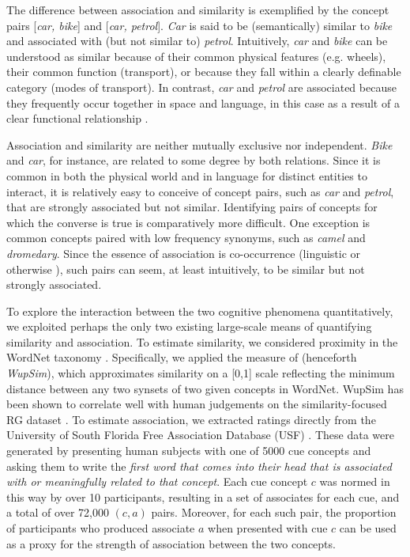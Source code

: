 The difference between association and similarity is exemplified by the concept pairs [\emph{car, bike}] and [\emph{car, petrol}]. \emph{Car} is said to be (semantically) similar to \emph{bike} and associated with (but not similar to) \emph{petrol}. Intuitively, \emph{car} and \emph{bike} can be understood as similar because of their common physical features (e.g. wheels), their common function (transport), or because they fall within a clearly definable category (modes of transport). In contrast, \emph{car} and \emph{petrol} are associated because they frequently occur together in space and language, in this case as a result of a clear functional relationship \cite{plaut1995semantic,mcrae2012semantic}. 

Association and similarity are neither mutually exclusive nor independent. \emph{Bike} and \emph{car}, for instance, are related to some degree by both relations. Since it is common in both the physical world and in language for distinct entities to interact, it is relatively easy to conceive of concept pairs, such as \emph{car} and \emph{petrol}, that are strongly associated but not similar. Identifying pairs of concepts for which the converse is true is comparatively more difficult. One exception is common concepts paired with low frequency synonyms, such as \emph{camel} and \emph{dromedary}. Since the essence of association is co-occurrence (linguistic or otherwise \cite{mcrae2012semantic}), such pairs can seem, at least intuitively, to be similar but not strongly associated.  

To explore the interaction between the two cognitive phenomena quantitatively, we exploited perhaps the only two existing large-scale means of quantifying similarity and association. To estimate similarity, we considered proximity in the WordNet taxonomy \cite{fellbaum1999wordnet}. Specifically, we applied the measure of \cite{wu1994verbs} (henceforth \emph{WupSim}), which approximates similarity on a [0,1] scale reflecting the minimum distance between any two synsets of two given concepts in WordNet. WupSim has been shown to correlate well with human judgements on the similarity-focused RG dataset \cite{wu1994verbs}. To estimate association, we extracted ratings directly from the University of South Florida Free Association Database (USF) \cite{nelson2004university}. These data were generated by presenting human subjects with one of 5000 cue concepts and asking them to write the \emph{first word that comes into their head that is associated with or meaningfully related to that concept}. Each cue concept \( c \) was normed in this way by over 10 participants, resulting in a set of associates for each cue, and a total of over 72,000 \((c,a)\) pairs. Moreover, for each such pair, the proportion of participants who produced associate \(a\) when presented with cue \(c\) can be used as a proxy for the strength of association between the two concepts.

